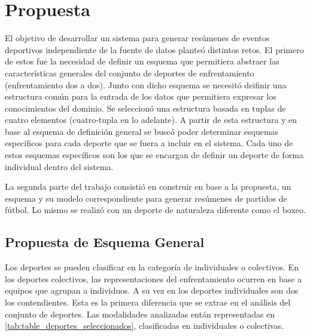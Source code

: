 \chapter{Propuesta}\label{chapter:proposal}
 
    El objetivo de desarrollar un sistema para generar resúmenes de eventos deportivos independiente de la fuente de datos 
planteó distintos retos. El primero de estos fue la necesidad de definir un esquema que permitiera abstraer las características 
generales del conjunto de deportes de enfrentamiento (enfrentamiento dos a dos). Junto con dicho esquema se necesitó 
deifinir una estructura común para la entrada de los datos que permitiera expresar los conocimientos del dominio. Se seleccionó 
una estructura basada en tuplas de cuatro elementos (cuatro-tupla en lo adelante). A partir de esta estructura y en base 
al esquema de definición general se buscó poder determinar esquemas específicos para cada deporte que se fuera a incluir en el 
sistema. Cada uno de estos esquemas específicos son los que se encargan de definir un deporte de forma individual dentro del sistema.
    
    La segunda parte del trabajo consistió en construir en base a la propuesta, un esquema y su modelo correspondiente para generar 
resúmenes de partidos de fútbol. Lo mismo se realizó con un deporte de naturaleza diferente como el boxeo.

\section{Propuesta de Esquema General}

    Los deportes se pueden clasificar en la categoría de individuales o colectivos. En los deportes colectivos, las representaciones 
del enfrentamiento ocurren en base a equipos que agrupan a individuos. A su vez en los deportes individuales son dos los contendientes.
Esta es la primera diferencia que se extrae en el análisis del conjunto de deportes. Las modalidades analizadas entán representadas en \ref{tab:table_deportes_seleccionados}, 
clasificadas en individuales o colectivas.

